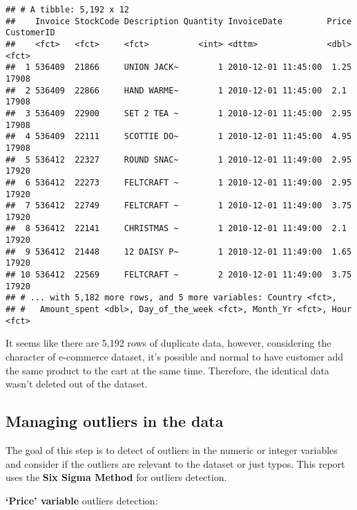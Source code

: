\documentclass[
]{article}
\begin{document}
\begin{verbatim}
## # A tibble: 5,192 x 12
##    Invoice StockCode Description Quantity InvoiceDate         Price CustomerID
##    <fct>   <fct>     <fct>          <int> <dttm>              <dbl> <fct>     
##  1 536409  21866     UNION JACK~        1 2010-12-01 11:45:00  1.25 17908     
##  2 536409  22866     HAND WARME~        1 2010-12-01 11:45:00  2.1  17908     
##  3 536409  22900     SET 2 TEA ~        1 2010-12-01 11:45:00  2.95 17908     
##  4 536409  22111     SCOTTIE DO~        1 2010-12-01 11:45:00  4.95 17908     
##  5 536412  22327     ROUND SNAC~        1 2010-12-01 11:49:00  2.95 17920     
##  6 536412  22273     FELTCRAFT ~        1 2010-12-01 11:49:00  2.95 17920     
##  7 536412  22749     FELTCRAFT ~        1 2010-12-01 11:49:00  3.75 17920     
##  8 536412  22141     CHRISTMAS ~        1 2010-12-01 11:49:00  2.1  17920     
##  9 536412  21448     12 DAISY P~        1 2010-12-01 11:49:00  1.65 17920     
## 10 536412  22569     FELTCRAFT ~        2 2010-12-01 11:49:00  3.75 17920     
## # ... with 5,182 more rows, and 5 more variables: Country <fct>,
## #   Amount_spent <dbl>, Day_of_the_week <fct>, Month_Yr <fct>, Hour <fct>
\end{verbatim}

It seems like there are 5,192 rows of duplicate data, however,
considering the character of e-commerce dataset, it's possible and
normal to have customer add the same product to the cart at the same
time. Therefore, the identical data wasn't deleted out of the dataset.

\hypertarget{managing-outliers-in-the-data}{%
\subsection{Managing outliers in the
data}\label{managing-outliers-in-the-data}}

The goal of this step is to detect of outliers in the numeric or integer
variables and consider if the outliers are relevant to the dataset or
just typos. This report uses the \textbf{Six Sigma Method} for outliers
detection.

\textbf{`Price' variable} outliers detection:
\end{document}
